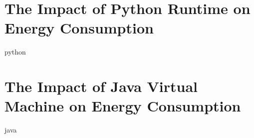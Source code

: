 \newpage
% 

\chapter{The Impact of Python Runtime on Energy Consumption}
\label{chapter:python}
{python}

\chapter{The Impact of Java Virtual Machine on Energy Consumption}
\label{chapter:java}
{java}